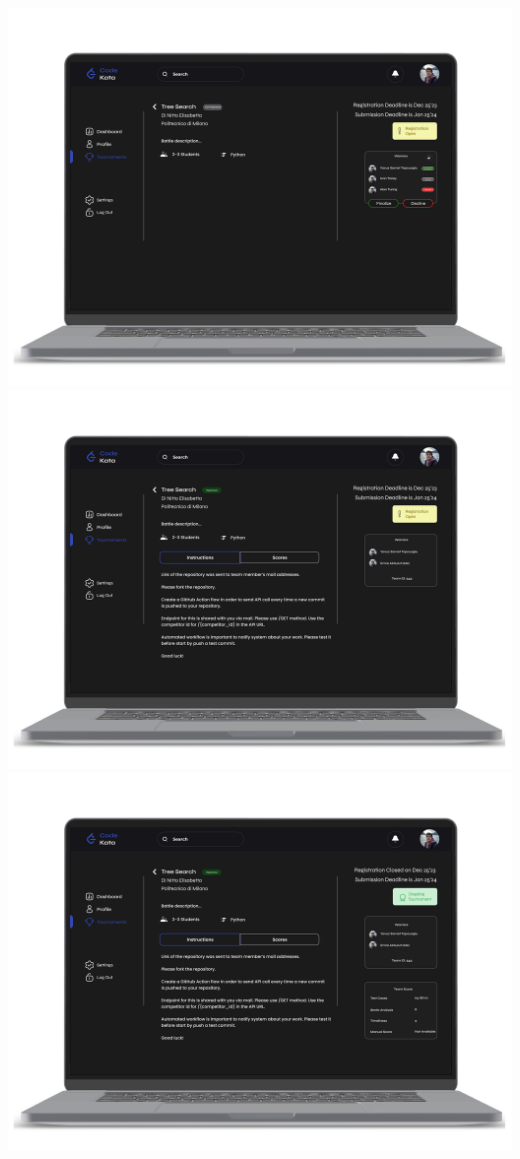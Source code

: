 \newpage
\begin{center}
\includegraphics[scale=0.13]{Images/ui-ux/student_battle_1.png}
\includegraphics[scale=0.13]{Images/ui-ux/student_battle_2.png}
\includegraphics[scale=0.13]{Images/ui-ux/student_battle_3.png}

\end{center}
